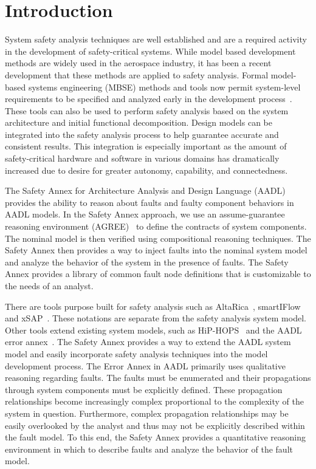 \section{Introduction}
System safety analysis techniques are well established and are a required activity in the development of safety-critical systems. While model based development methods are widely used in the aerospace industry, it has been a recent development that these methods are applied to safety analysis. Formal model-based systems engineering (MBSE) methods and tools now permit system-level requirements to be specified and analyzed early in the development process~\cite{NFM2012:CoGaMiWhLaLu,CAV2015:BoCiGrMa}. These tools can also be used to perform safety analysis based on the system architecture and initial functional decomposition. Design models can be integrated into the safety analysis process to help guarantee accurate and consistent results. This integration is especially important as the amount of safety-critical hardware and software in various domains has dramatically increased due to desire for greater autonomy, capability, and connectedness.

The Safety Annex for Architecture Analysis and Design Language (AADL) provides the ability to reason about faults and faulty component behaviors in AADL models. In the Safety Annex approach, we use an assume-guarantee reasoning environment (AGREE)~\cite{NFM2012:CoGaMiWhLaLu} to define the contracts of system components. The nominal model is then verified using compositional reasoning techniques. The Safety Annex then provides a way to inject faults into the nominal system model and analyze the behavior of the system in the presence of faults. The Safety Annex provides a library of common fault node definitions that is customizable to the needs of an analyst. 

There are tools purpose built for safety analysis such as AltaRica~\cite{PROSVIRNOVA2013127}, smartIFlow~\cite{info8010007} and xSAP~\cite{DBLP:conf/tacas/BittnerBCCGGMMZ16}. These notations are separate from the safety analysis system model. Other tools extend existing system models, such as HiP-HOPS~\cite{CHEN201391} and the AADL error annex~\cite{SAEAS}. The Safety Annex provides a way to extend the AADL system model and easily incorporate safety analysis techniques into the model development process. The Error Annex in AADL primarily uses qualitative reasoning regarding faults. The faults must be enumerated and their propagations through system components must be explicitly defined. These propagation relationships become increasingly complex proportional to the complexity of the system in question. Furthermore, complex propagation relationships may be easily overlooked by the analyst and thus may not be explicitly described within the fault model. To this end, the Safety Annex provides a quantitative reasoning environment in which to describe faults and analyze the behavior of the fault model.

